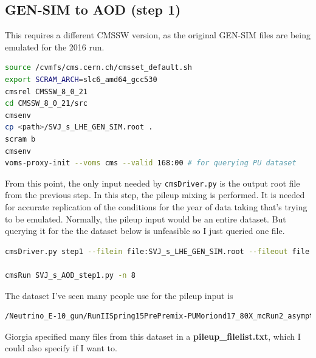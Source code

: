 \subsection{GEN-SIM to AOD (step 1)}

This requires a different CMSSW version, as the original GEN-SIM files are being emulated for the 2016 run.

\begin{lstlisting}[belowskip=-0.7cm, language=sh, numbers=none]
source /cvmfs/cms.cern.ch/cmsset_default.sh
export SCRAM_ARCH=slc6_amd64_gcc530
cmsrel CMSSW_8_0_21
cd CMSSW_8_0_21/src
cmsenv
cp <path>/SVJ_s_LHE_GEN_SIM.root .
scram b
cmsenv
voms-proxy-init --voms cms --valid 168:00 # for querying PU dataset
\end{lstlisting}

From this point, the only input needed by \texttt{cmsDriver.py} is the output root file from the previous step. In this step, the pileup mixing is performed. It is needed for accurate replication of the conditions for the year of data taking that's trying to be emulated. Normally, the pileup input would be an entire dataset. But querying it for the the dataset below is unfeasible so I just queried one file. 

\begin{lstlisting}[belowskip=-0.7cm, language=sh, numbers=none]
cmsDriver.py step1 --filein file:SVJ_s_LHE_GEN_SIM.root --fileout file:SVJ_s_AOD_step1.root --pileup_input /store/mc/RunIISpring15PrePremix/Neutrino_E-10_gun/GEN-SIM-DIGI-RAW/PUMoriond17_80X_mcRun2_asymptotic_2016_TrancheIV_v2-v2/100000/001EB167-3781-E611-BE3C-0CC47A4D75F4.root --mc --eventcontent PREMIXRAW --datatier GEN-SIM-RAW --conditions 80X_mcRun2_asymptotic_2016_TrancheIV_v6 --step DIGIPREMIX_S2,DATAMIX,L1,DIGI2RAW,HLT:@frozen2016 --datamix PreMix --era Run2_2016 --python_filename SVJ_s_AOD_step1.py --no_exec --customise Configuration/DataProcessing/Utils.addMonitoring -n 250

cmsRun SVJ_s_AOD_step1.py -n 8
\end{lstlisting}

The dataset I've seen many people use for the pileup input is

\begin{lstlisting}[belowskip=-0.7cm, language=sh, numbers=none]
/Neutrino_E-10_gun/RunIISpring15PrePremix-PUMoriond17_80X_mcRun2_asymptotic_2016_TrancheIV_v2-v2/GEN-SIM-DIGI-RAW
\end{lstlisting}

Giorgia specified many files from this dataset in a \textbf{pileup\_filelist.txt}, which I could also specify if I want to.


